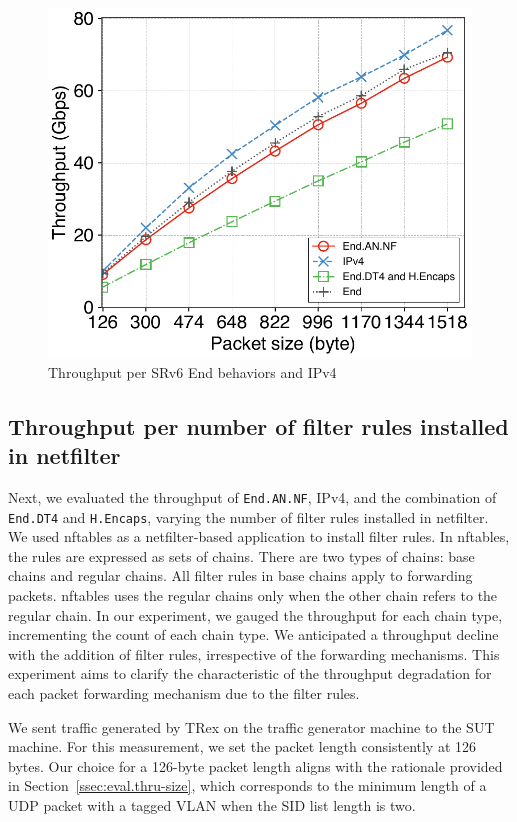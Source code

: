 \begin{figure}[t]
  \centering
  \includegraphics[width=0.95\linewidth]{img/size-throughput.pdf}
  \caption{Throughput per SRv6 End behaviors and IPv4}
  \label{fig:size-thru}
\end{figure}


\subsection{Throughput per number of filter rules installed in netfilter}
\label{ssec:eval.thru-chains}

Next, we evaluated the throughput of \texttt{End.AN.NF}, IPv4, and the combination of \texttt{End.DT4} and \texttt{H.Encaps}, varying the number of filter rules installed in netfilter.
We used nftables as a netfilter-based application to install filter rules.
In nftables, the rules are expressed as sets of chains.
There are two types of chains: base chains and regular chains.
All filter rules in base chains apply to forwarding packets.
nftables uses the regular chains only when the other chain refers to the regular chain.
In our experiment, we gauged the throughput for each chain type, incrementing the count of each chain type.
We anticipated a throughput decline with the addition of filter rules, irrespective of the forwarding mechanisms.
This experiment aims to clarify the characteristic of the throughput degradation for each packet forwarding mechanism due to the filter rules.


We sent traffic generated by TRex on the traffic generator machine to the SUT machine.
For this measurement, we set the packet length consistently at 126 bytes.
Our choice for a 126-byte packet length aligns with the rationale provided in Section~\ref{ssec:eval.thru-size}, which corresponds to the minimum length of a UDP packet with a tagged VLAN when the SID list length is two.


